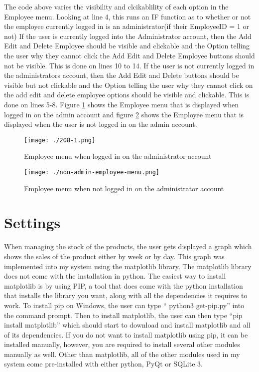 \begin{python}
The code above varies the visibility and clcikablility of each option in the Employee menu. Looking at line 4, this runs an IF function as to whether or not the employee currently logged in is an administrator(if their EmployeeID = 1 or not) If the user is currently logged into the Administrator account, then the Add Edit and Delete Employee should be visible and clickable and the Option telling the user why they cannot click the Add Edit and Delete Employee buttons should not be visible. This is done on lines 10 to 14. If the user is not currently logged in the administrators account, then the Add Edit and Delete buttons should be visible but not clickable and the Option telling the user why they cannot click on the add edit and delete employee options should be visible and clickable. This is done on lines 5-8. Figure \ref{fig:admin-employee-menu} shows the Employee menu that is displayed when logged in on the admin account and figure \ref{fig:non-admin-employee-menu} shows the Employee menu that is displayed when the user is not logged in on the admin account.



\begin{figure}[H]
\caption{Employee menu when logged in on the administrator account} \label{fig:admin-employee-menu}
\texttt{[image: ./208-1.png]}
\end{figure}


\begin{figure}[H]
\caption{Employee menu when not logged in on the administrator account} \label{fig:non-admin-employee-menu}
\texttt{[image: ./non-admin-employee-menu.png]}
\end{figure}





\section{Settings}

When managing the stock of the products, the user gets displayed a graph which shows the sales of the product either by week or by day. This graph was implemented into my system using the matplotlib library. The matplotlib library does not come with the installation in python. The easiest way to install matplotlib is by using PIP, a tool that does come with the python installation that installs the library you want, along with all the dependencies it requires to work. To install pip on Windows, the user can type `` python3 get-pip.py'' into the command prompt. Then to install matplotlib, the user can then type ``pip install matplotlib'' which should start to download and install matplotlib and all of its dependencies. If you do not want to install matplotlib using pip, it can be installed manually, however, you are required to install several other modules manually as well. Other than matplotlib, all of the other modules used in my system come pre-installed with either python, PyQt or SQLite 3.


\end{python}
